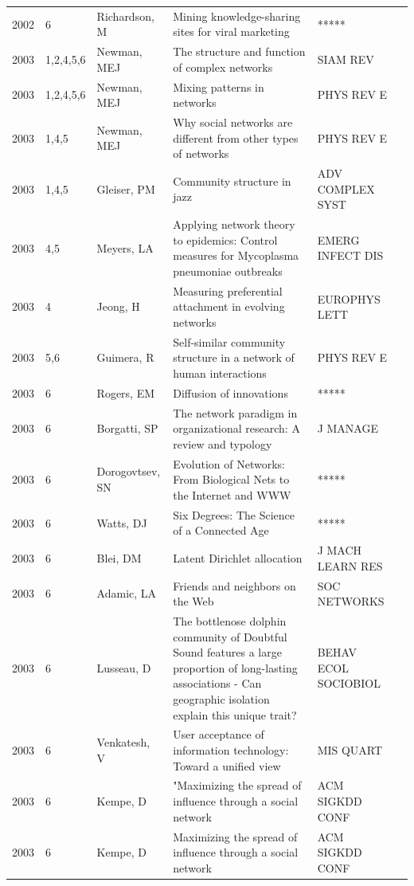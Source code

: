 \documentclass[11pt]{article} %
\begin{document}
\begin{longtable}{p{0.8cm}|p{1.25cm}|p{2.8cm}|p{7.5cm}|p{3cm}l}
2002&	6&	Richardson, M&	 Mining knowledge-sharing sites for viral marketing&         	*****\\
2003&	1,2,4,5,6&	Newman, MEJ&	 The structure and function of complex networks&         	SIAM REV\\
2003&	1,2,4,5,6&	Newman, MEJ&	 Mixing patterns in networks&         	PHYS REV E\\
2003&	1,4,5&	Newman, MEJ&	 Why social networks are different from other types of networks&         	PHYS REV E\\
2003&	1,4,5&	Gleiser, PM&	 Community structure in jazz&         	ADV COMPLEX SYST\\
2003&	4,5&	Meyers, LA&	 Applying network theory to epidemics: Control measures for Mycoplasma pneumoniae outbreaks&         	EMERG INFECT DIS\\
2003&	4&	Jeong, H&	 Measuring preferential attachment in evolving networks&         	EUROPHYS LETT\\
2003&	5,6&	Guimera, R&	 Self-similar community structure in a network of human interactions&         	PHYS REV E\\
2003&	6&	Rogers, EM&	 Diffusion of innovations&         	*****\\
2003&	6&	Borgatti, SP&	 The network paradigm in organizational research: A review and typology&         	J MANAGE\\
2003&	6&	Dorogovtsev, SN&	 Evolution of Networks: From Biological Nets to the Internet and WWW&         	*****\\
2003&	6&	Watts, DJ&	 Six Degrees: The Science of a Connected Age&         	*****\\
2003&	6&	Blei, DM&	 Latent Dirichlet allocation&         	J MACH LEARN RES\\
2003&	6&	Adamic, LA&	 Friends and neighbors on the Web&         	SOC NETWORKS\\
2003&	6&	Lusseau, D&	 The bottlenose dolphin community of Doubtful Sound features a large proportion of long-lasting associations - Can geographic isolation explain this unique trait?&         	BEHAV ECOL SOCIOBIOL\\
2003&	6&	Venkatesh, V&	 User acceptance of information technology: Toward a unified view&         	MIS QUART\\
2003&	6&	Kempe, D &	"Maximizing the spread of influence
through a social network&ACM SIGKDD CONF \\
2003&	6&	Kempe, D &	Maximizing the spread of influence through a social network&         	ACM SIGKDD CONF \\

\end{longtable}
\end{document}
